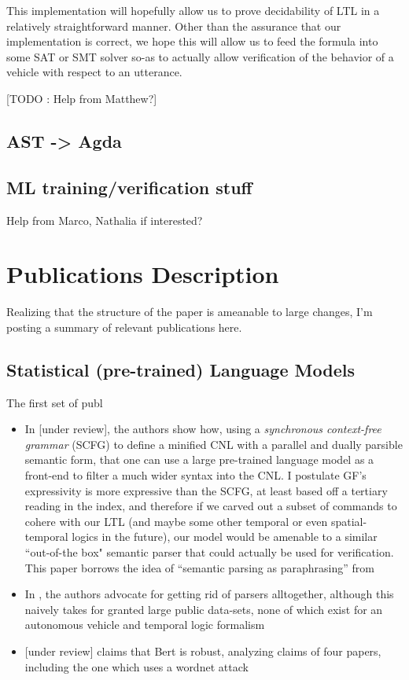 \documentclass[a4paper, 11pt]{article}
\begin{document}
This implementation will hopefully allow us to prove decidability of LTL in a
relatively straightforward manner. Other than the assurance that our
implementation is correct, we hope this will allow us to feed the formula into
some SAT or SMT solver so-as to actually allow verification of the behavior of a
vehicle with respect to an utterance.

[TODO : Help from Matthew?]

\subsection{AST -> Agda}

\subsection{ML training/verification stuff}
Help from Marco, Nathalia if interested?


\section{Publications Description}

Realizing that the structure of the paper is ameanable to large changes, I'm
posting a summary of relevant publications here.

\subsection{Statistical (pre-trained) Language Models}
The first set of publ

\begin{itemize}

\item In \cite{fewShotSem} [under review], the authors show how, using a \emph{synchronous
context-free grammar} (SCFG) to define a minified CNL with a parallel and dually
parsible semantic form, that one can use a large pre-trained language model as a front-end
to filter a much wider syntax into the CNL. I postulate GF's expressivity is
more expressive than the SCFG, at least based off a tertiary reading in the
index, and therefore if we carved out a subset of commands to cohere with our
LTL (and maybe some other temporal or even spatial-temporal logics in the
future), our model would be amenable to a similar ``out-of-the box" semantic
parser that could actually be used for verification. This paper borrows the idea
of ``semantic parsing as paraphrasing'' from  \cite{berant-liang-2014-semantic}

\item In \cite{dontParse}, the authors advocate for getting rid of parsers
  alltogether, although this naively takes for granted large public data-sets,
  none of which exist for an autonomous vehicle and temporal logic formalism
\item  \cite{hauser2021bert} [under review] claims that Bert is robust, analyzing claims of four
  papers, including the one which uses a wordnet attack

\end{itemize}
\end{document}
